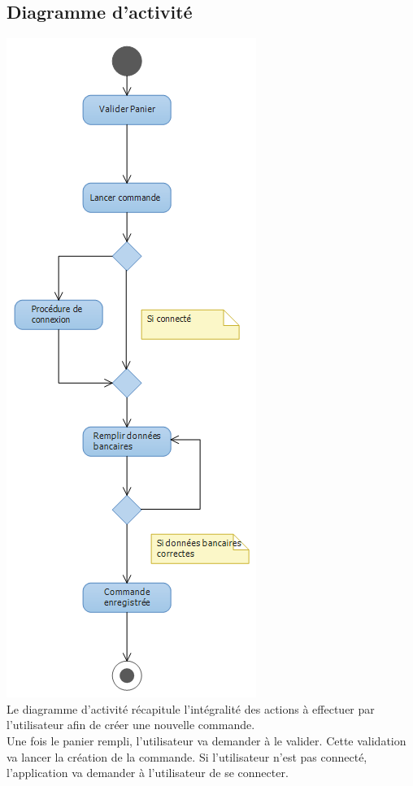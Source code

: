 	\subsection{Diagramme d'activité}
	\includegraphics[scale=0.5]{Res/activityCOmmande.png} \\
	Le diagramme d'activité récapitule l’intégralité des actions à effectuer par l'utilisateur afin de créer une nouvelle commande. \\

	Une fois le panier rempli, l'utilisateur va demander à le valider. Cette validation va lancer la création de la commande. Si l'utilisateur n'est pas connecté, l'application va demander à l'utilisateur de se connecter.

